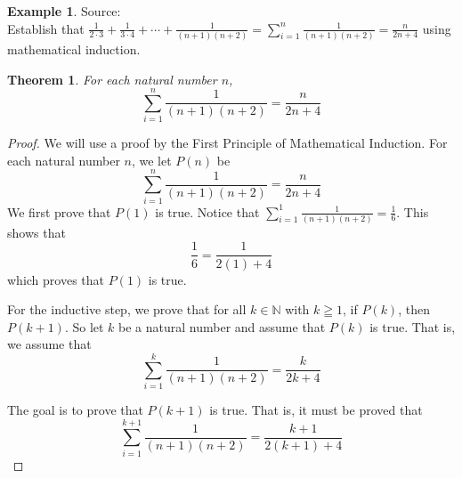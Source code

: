\documentclass{book}
\newtheorem{theorem}{Theorem}[section]
\theoremstyle{definition}
\newtheorem{example}{Example}[definition]
\theoremstyle{remark}
\newcommand{\bb}[1]{\mathbb{#1}}
\newcommand{\m}{\cdot}
\begin{document}
\newpage
\begin{example}
\label{sdf1}
Source: \cite[Chap.6, S.6.1, Result 6.6]{gray} \\ 

Establish that $\frac{1}{2 \m 3} + \frac{1}{3 \m 4} + \cdots + \frac{1}{(n+1)(n+2)} = \sum_{i=1}^{n}{\frac{1}{(n+1)(n+2)}} = \frac{n}{2n +4} $ using mathematical induction.
    \begin{tcolorbox}
        \begin{theorem}
            For each natural number $n$,
                \begin{equation*}
                    \sum_{i=1}^{n}{\frac{1}{(n+1)(n+2)}} = \frac{n}{2n + 4}
                \end{equation*}
        \end{theorem}
    \end{tcolorbox}

    \begin{proof}
        We will use a proof by the First Principle of Mathematical Induction. For each natural number $n$, we let $P(n)$ be
            \begin{equation*}
                \sum_{i=1}^{n}{\frac{1}{(n+1)(n+2)}} = \frac{n}{2n +4}
            \end{equation*}
        We first prove that $P(1)$ is true. Notice that $\sum_{i=1}^{1}{\frac{1}{(n+1)(n+2)}} = \frac{1}{6}$. This shows that   
            \begin{equation*}
                 \frac{1}{6} = \frac{1}{2(1) +4}
            \end{equation*}
        which proves that $P(1)$ is true. 
        
        For the inductive step, we prove that for all $k \in \bb{N}$ with $k \geqq 1$, if $P(k)$, then $P(k+1)$. So let $k$ be a natural number and assume that $P(k)$ is true. That is, we assume that 
            \begin{equation*}
                \sum_{i=1}^{k}{\frac{1}{(n+1)(n+2)}} = \frac{k}{2k + 4}
            \end{equation*}
        
        The goal is to prove that $P(k+1)$ is true. That is, it must be proved that  
            \begin{equation}
            \label{dne6}
                \sum_{i=1}^{k+1}{\frac{1}{(n+1)(n+2)}} = \frac{k+1}{2(k+1) + 4}           
            \end{equation}
        

\end{proof}
\end{example}
\end{document}
